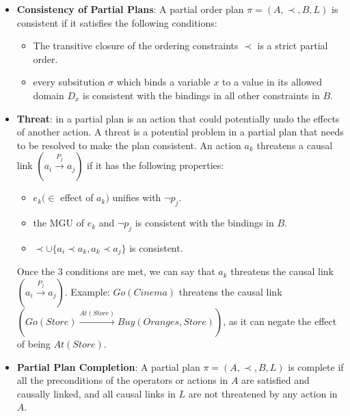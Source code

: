 \begin{itemize}
    \item  \label{def:consistency_partial_plan}
          \textbf{Consistency of Partial Plans}: A partial order plan $\pi = (A, \prec, B, L)$ is consistent if it satisfies the following conditions: \cite{10.5555/975615}
          \begin{itemize}
              \item The transitive closure of the ordering constraints $\prec$ is a strict partial order.
              \item every subsitution $\sigma $ which binds a variable $x$ to a value in its allowed domain $D_x$ is consistent with the bindings in all other constraints in $B$.
          \end{itemize}


    \item  \label{def:threat}
          \textbf{Threat}: in a partial plan is an action that could potentially undo the effects of another action. A threat is a potential problem in a partial plan that needs to be resolved to make the plan consistent. An action $a_k$ threatens a causal link $(a_i \xrightarrow{\text{$P_j$}}  a_j)$ if it has the following properties: \cite{10.5555/975615}
          \begin{itemize}
              \item $e_k (\in$ effect of $a_k)$ unifies with $\lnot p_j$.
              \item the \ac{MGU} of $e_k$ and $\lnot p_j$ is consistent with the bindings in $B$.
              \item $\prec \cup \{a_i \prec a_k, a_k \prec a_j\}$ is consistent.
          \end{itemize}
          Once the 3 conditions are met, we can say that $a_k$ threatens the causal link $(a_i \xrightarrow{\text{$P_j$}}  a_j)$.
          Example: $Go(Cinema)$ threatens the causal link $(Go(Store) \xrightarrow{\text{$At(Store)$}} Buy(Oranges,Store))$, as it can negate the effect of being $At(Store)$.

    \item  \label{def:partial_plan_completion}
          \textbf{Partial Plan Completion}: A partial plan $\pi = (A, \prec, B, L)$ is complete if all the preconditions of the operators or actions in $A$ are satisfied and causally linked, and all causal links in $L$ are not threatened by any action in $A$. \cite{10.5555/975615}

\end{itemize}








